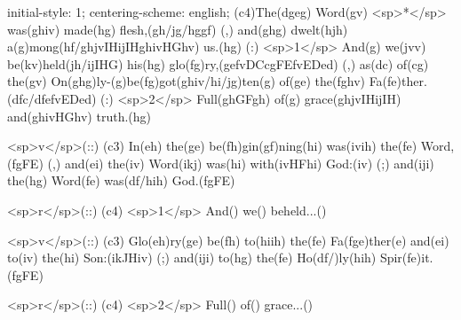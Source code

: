 initial-style: 1;
centering-scheme: english;
(c4)The(dgeg) Word(gv) <sp>*</sp> was(ghiv) made(hg) flesh,(gh/jg/hggf) (,) and(ghg) dwelt(hjh) a(g)mong(hf/ghjvIHijIHghivHGhv) us.(hg) (:) <sp>1</sp> And(g) we(jvv) be(kv)held(jh/ijIHG) his(hg) glo(fg)ry,(gefvDCcgFEfvEDed) (,) as(dc) of(cg) the(gv) On(ghg)ly-(g)be(fg)got(ghiv/hi/jg)ten(g) of(ge) the(fghv) Fa(fe)ther.(dfc/dfefvEDed) (:) <sp>2</sp> Full(ghGFgh) of(g) grace(ghjvIHijIH) and(ghivHGhv) truth.(hg) 

<sp>v</sp>(::) (c3) In(eh) the(ge) be(fh)gin(gf)ning(hi) was(ivih) the(fe) Word,(fgFE) (,) and(ei) the(iv) Word(ikj) was(hi) with(ivHFhi) God:(iv) (;) and(iji) the(hg) Word(fe) was(df/hih) God.(fgFE) 

<sp>r</sp>(::) (c4) <sp>1</sp> And() we() beheld...()

<sp>v</sp>(::) (c3) Glo(eh)ry(ge) be(fh) to(hiih) the(fe) Fa(fge)ther(e) and(ei) to(iv) the(hi) Son:(ikJHiv) (;) and(iji) to(hg) the(fe) Ho(df/)ly(hih) Spir(fe)it.(fgFE)

<sp>r</sp>(::) (c4) <sp>2</sp> Full() of() grace...()